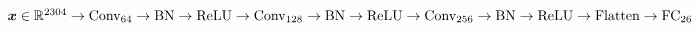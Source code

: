 $\vect{x} \in \real^{2304} \newline
	\rightarrow \text{Conv}_{64} \rightarrow \text{BN} \rightarrow \text{ReLU}  \newline
	\rightarrow \text{Conv}_{128} \rightarrow \text{BN} \rightarrow \text{ReLU}  \newline
	\rightarrow \text{Conv}_{256} \rightarrow \text{BN} \rightarrow \text{ReLU}  \newline
	\rightarrow \text{Flatten} \rightarrow \text{FC}_{26}
$